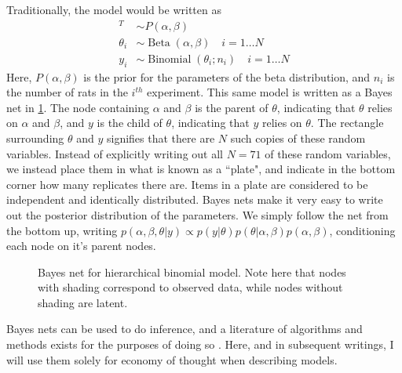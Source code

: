Traditionally, the model would be written as 
%
\begin{align*}
	[\alpha,\beta]^T &\sim P(\alpha, \beta) \\
	\theta_i &\sim \operatorname{Beta}(\alpha,\beta) \quad i = 1 \dots N\\
	y_i &\sim \operatorname{Binomial}(\theta_i ; n_i) \quad i = 1 \dots N
	\end{align*}
%
Here, $ P(\alpha, \beta)  $ is the prior for the parameters of the beta distribution, and $ n_i $ is the number of rats in the $ i^{th} $ experiment.  This same model is written as a Bayes net in \cref{bayesnet}.   The node containing $ \alpha $ and $ \beta $ is the parent of $ \theta $, indicating that $ \theta $ relies on $ \alpha $ and $ \beta $, and $ y $ is the child of $ \theta $, indicating that $ y $ relies on $ \theta $.  The rectangle surrounding $ \theta $ and $ y $ signifies that there are $ N $ such copies of these random variables.  Instead of explicitly writing out all $ N=71 $ of these random variables, we instead place them in what is known as a ``plate", and indicate in the bottom corner how many replicates there are.  Items in a plate are considered to be independent and identically distributed.  Bayes nets make it very easy to write out the posterior distribution of the parameters.  We simply follow the net from the bottom up, writing $ p(\alpha,\beta, \theta \vert y) \propto p(y\vert \theta)p(\theta \vert \alpha, \beta)p(\alpha,\beta) $, conditioning each node on it's parent nodes.

\begin{figure}[h!]

	\centering
	\caption[Hierarchical binomial model bayes net]{Bayes net for hierarchical binomial model.  Note here that nodes with shading correspond to observed data, while nodes without shading are latent.}
	\label{bayesnet}
\end{figure}

Bayes nets can be used to do inference, and a literature of algorithms and methods exists for the purposes of doing so \cite{Bishop2006pattern,koller2009probabilistic}.  Here, and in subsequent writings, I will use them solely for economy of thought when describing models.


